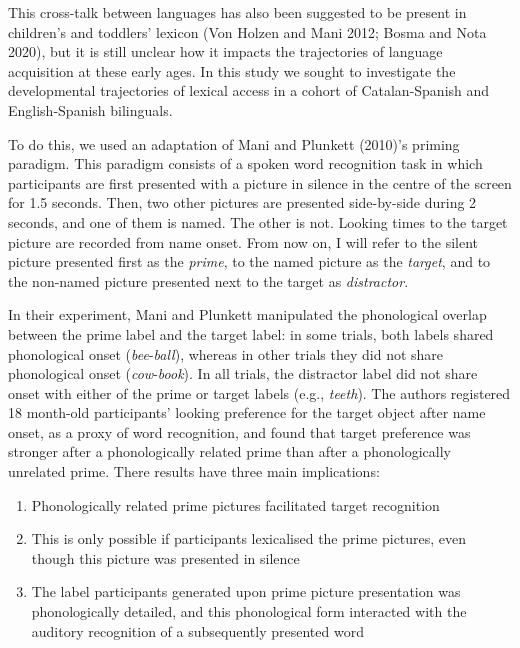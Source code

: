 \documentclass[
]{article}
\providecommand{\tightlist}{%
  \setlength{\itemsep}{0pt}\setlength{\parskip}{0pt}}
\begin{document}
This cross-talk between languages has also been suggested to be present
in children's and toddlers' lexicon (Von Holzen and Mani 2012; Bosma and
Nota 2020), but it is still unclear how it impacts the trajectories of
language acquisition at these early ages. In this study we sought to
investigate the developmental trajectories of lexical access in a cohort
of Catalan-Spanish and English-Spanish bilinguals.

To do this, we used an adaptation of Mani and Plunkett (2010)'s priming
paradigm. This paradigm consists of a spoken word recognition task in
which participants are first presented with a picture in silence in the
centre of the screen for 1.5 seconds. Then, two other pictures are
presented side-by-side during 2 seconds, and one of them is named. The
other is not. Looking times to the target picture are recorded from name
onset. From now on, I will refer to the silent picture presented first
as the \emph{prime}, to the named picture as the \emph{target}, and to
the non-named picture presented next to the target as \emph{distractor}.

In their experiment, Mani and Plunkett manipulated the phonological
overlap between the prime label and the target label: in some trials,
both labels shared phonological onset (\emph{bee}-\emph{ball}), whereas
in other trials they did not share phonological onset
(\emph{cow}-\emph{book}). In all trials, the distractor label did not
share onset with either of the prime or target labels (e.g.,
\emph{teeth}). The authors registered 18 month-old participants' looking
preference for the target object after name onset, as a proxy of word
recognition, and found that target preference was stronger after a
phonologically related prime than after a phonologically unrelated
prime. There results have three main implications:

\begin{enumerate}
\def\labelenumi{\arabic{enumi})}
\tightlist
\item
  Phonologically related prime pictures facilitated target recognition
\item
  This is only possible if participants lexicalised the prime pictures,
  even though this picture was presented in silence
\item
  The label participants generated upon prime picture presentation was
  phonologically detailed, and this phonological form interacted with
  the auditory recognition of a subsequently presented word
\end{enumerate}
\end{document}
